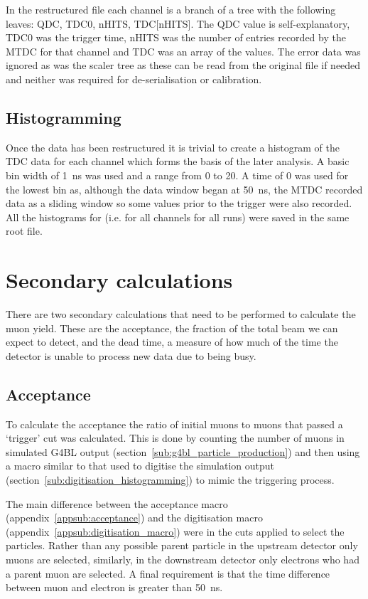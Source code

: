 In the restructured file each channel is a branch of a tree with the following leaves: QDC, TDC0, nHITS, TDC[nHITS]. The QDC value is self-explanatory, TDC0 was the trigger time, nHITS was the number of entries recorded by the MTDC for that channel and TDC was an array of the values. The error data was ignored as was the scaler tree as these can be read from the original file if needed and neither was required for de-serialisation or calibration.
\subsection{Histogramming} %
\label{sub:Histogramming}
Once the data has been restructured it is trivial to create a histogram of the TDC data for each channel which forms the basis of the later analysis. A basic bin width of 1~ns was used and a range from 0 to 20\mus. A time of 0 was used for the lowest bin as, although the data window began at 50~ns, the MTDC recorded data as a sliding window so some values prior to the trigger were also recorded. All the histograms for (i.e. for all channels for all runs) were saved in the same root file.
\section{Secondary calculations} %
\label{sec:secondary_calculations}
There are two secondary calculations that need to be performed to calculate the muon yield. These are the acceptance, the fraction of the total beam we can expect to detect, and the dead time, a measure of how much of the time the detector is unable to process new data due to being busy.
\subsection{Acceptance} %
\label{sub:acceptance}
To calculate the acceptance the ratio of initial muons to muons that passed a `trigger' cut was calculated. This is done by counting the number of muons in simulated G4BL output (section~\ref{sub:g4bl_particle_production}) and then using a macro similar to that used to digitise the simulation output (section~\ref{sub:digitisation_histogramming}) to mimic the triggering process.

The main difference between the acceptance macro (appendix~\ref{appsub:acceptance}) and the digitisation macro (appendix~\ref{appsub:digitisation_macro}) were in the cuts applied to select the particles. Rather than any possible parent particle in the upstream detector only muons are selected, similarly, in the downstream detector only electrons who had a parent muon are selected. A final requirement is that the time difference between muon and electron is greater than 50~ns.

